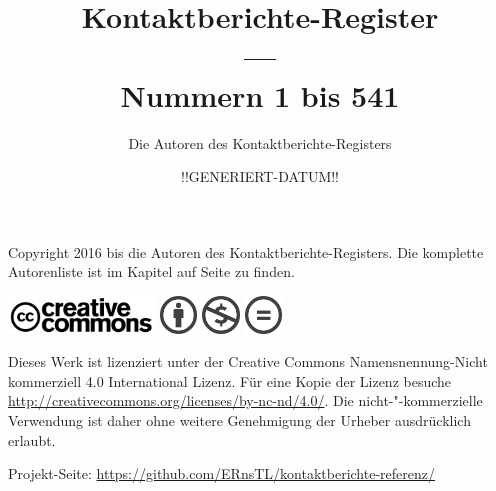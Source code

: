 \documentclass[ngerman,10pt]{book}
\title{Kontaktberichte-Register \\ --- \\ \Large{Nummern 1 bis 541}}
\author{Die Autoren des Kontaktberichte-Registers}
\date{!!GENERIERT-DATUM!!}%
\begin{document}
\frontmatter



\maketitle




\thispagestyle{empty}
\null    %
\vfill

\noindent Copyright {\textcopyright} 2016 bis {\the\year} die Autoren des Kontaktberichte-Registers. Die komplette Autorenliste ist im Kapitel \emph{} auf Seite \pageref{ch:mitwirkende} zu finden.%

\vspace{2mm}

\includegraphics[height=10mm,keepaspectratio=true]{CreativeCommons_logo_trademark}
\includegraphics[height=10mm,keepaspectratio=true]{chooser_by} \includegraphics[height=10mm,keepaspectratio=true]{chooser_nc} \includegraphics[height=10mm,keepaspectratio=true]{chooser_nd}

\vspace{2mm}

\noindent Dieses Werk ist lizenziert unter der Creative Commons Namensnennung-Nicht kommerziell 4.0 International Lizenz. Für eine Kopie der Lizenz besuche \url{http://creativecommons.org/licenses/by-nc-nd/4.0/}. Die nicht-"-kommerzielle Verwendung ist daher ohne weitere Genehmigung der Urheber ausdrücklich erlaubt.

\vspace{2mm}

\noindent Projekt-Seite: \url{https://github.com/ERnsTL/kontaktberichte-referenz/}

\vspace{2mm}
\end{document}
